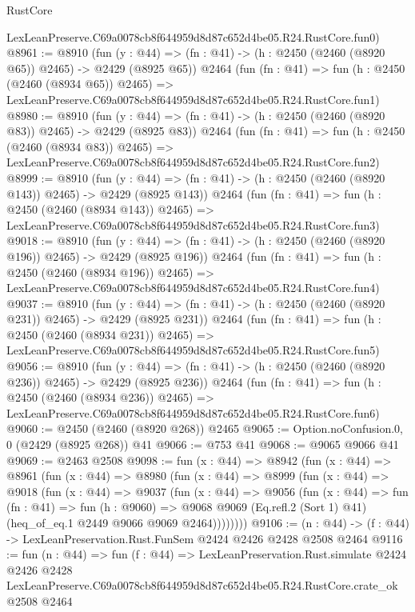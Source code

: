 \begin{lexlean}{RustCore}
\begin{coremodule}
    LexLeanPreserve.C69a0078cb8f644959d8d87c652d4be05.R24.RustCore.fun0)
@8961 := @8910
    (fun (y : @44) => (fn : @41) -> (h : @2450 (@2460 (@8920 @65)) @2465) -> @2429 (@8925 @65))
    @2464
    (fun (fn : @41) =>
    fun (h : @2450 (@2460 (@8934 @65)) @2465) =>
    LexLeanPreserve.C69a0078cb8f644959d8d87c652d4be05.R24.RustCore.fun1)
@8980 := @8910
    (fun (y : @44) => (fn : @41) -> (h : @2450 (@2460 (@8920 @83)) @2465) -> @2429 (@8925 @83))
    @2464
    (fun (fn : @41) =>
    fun (h : @2450 (@2460 (@8934 @83)) @2465) =>
    LexLeanPreserve.C69a0078cb8f644959d8d87c652d4be05.R24.RustCore.fun2)
@8999 := @8910
    (fun (y : @44) => (fn : @41) -> (h : @2450 (@2460 (@8920 @143)) @2465) -> @2429 (@8925 @143))
    @2464
    (fun (fn : @41) =>
    fun (h : @2450 (@2460 (@8934 @143)) @2465) =>
    LexLeanPreserve.C69a0078cb8f644959d8d87c652d4be05.R24.RustCore.fun3)
@9018 := @8910
    (fun (y : @44) => (fn : @41) -> (h : @2450 (@2460 (@8920 @196)) @2465) -> @2429 (@8925 @196))
    @2464
    (fun (fn : @41) =>
    fun (h : @2450 (@2460 (@8934 @196)) @2465) =>
    LexLeanPreserve.C69a0078cb8f644959d8d87c652d4be05.R24.RustCore.fun4)
@9037 := @8910
    (fun (y : @44) => (fn : @41) -> (h : @2450 (@2460 (@8920 @231)) @2465) -> @2429 (@8925 @231))
    @2464
    (fun (fn : @41) =>
    fun (h : @2450 (@2460 (@8934 @231)) @2465) =>
    LexLeanPreserve.C69a0078cb8f644959d8d87c652d4be05.R24.RustCore.fun5)
@9056 := @8910
    (fun (y : @44) => (fn : @41) -> (h : @2450 (@2460 (@8920 @236)) @2465) -> @2429 (@8925 @236))
    @2464
    (fun (fn : @41) =>
    fun (h : @2450 (@2460 (@8934 @236)) @2465) =>
    LexLeanPreserve.C69a0078cb8f644959d8d87c652d4be05.R24.RustCore.fun6)
@9060 := @2450 (@2460 (@8920 @268)) @2465
@9065 := Option.noConfusion.{0, 0} (@2429 (@8925 @268)) @41
@9066 := @753 @41
@9068 := @9065 @9066 @41
@9069 := @2463 @2508
@9098 := fun (x : @44) =>
  @8942
    (fun (x : @44) =>
    @8961
      (fun (x : @44) =>
      @8980
        (fun (x : @44) =>
        @8999
          (fun (x : @44) =>
          @9018
            (fun (x : @44) =>
            @9037
              (fun (x : @44) =>
              @9056
                (fun (x : @44) =>
                fun (fn : @41) =>
                fun (h : @9060) =>
                @9068
                  @9069
                  (Eq.refl.{2} (Sort 1) @41)
                  (heq_of_eq.{1} @2449 @9066 @9069 @2464))))))))
@9106 := (n : @44) -> (f : @44) -> LexLeanPreservation.Rust.FunSem @2424 @2426 @2428 @2508 @2464
@9116 := fun (n : @44) =>
  fun (f : @44) =>
  LexLeanPreservation.Rust.simulate
    @2424
    @2426
    @2428
    LexLeanPreserve.C69a0078cb8f644959d8d87c652d4be05.R24.RustCore.crate_ok
    @2508
    @2464
\end{coremodule}
\end{lexlean}
